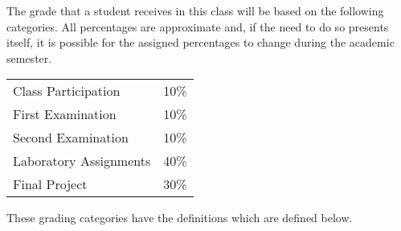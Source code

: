 \documentclass[11pt]{article} %
\begin{document}
The grade that a student receives in this class will be based on the following categories. All percentages are
approximate and, if the need to do so presents itself, it is possible for the assigned percentages to change during the
academic semester. 
\color{red}
\begin{center}
  \begin{tabular}{l|l}
\hline

   Class Participation & 10\% \\  
    First Examination & 10\% \\
    Second Examination & 10\% \\
    Laboratory  Assignments & 40\% \\
    Final Project & 30\% \\

    
    
\hline
  \end{tabular}
\end{center}
\color{black}
\noindent
These grading categories have the definitions which are defined below.
\vspace*{-.05in}
\end{document}
